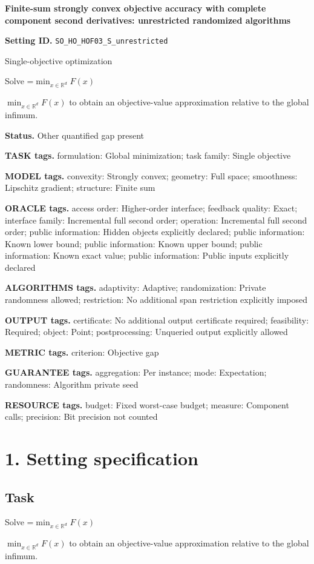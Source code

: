 \documentclass[10pt,a4paper]{article}
\newcommand{\AtlasMath}[1]{\par\begingroup\centering\setbox0=\hbox{$\displaystyle #1$}\ifdim\wd0>1.4\linewidth\typeout{ATLAS WIDE FORMULA: \the\wd0}\fi\ifdim\wd0>\linewidth\resizebox{\linewidth}{!}{\box0}\else\box0\fi\par\endgroup}
\newcommand{\AtlasInlineMath}[1]{\begingroup\setbox0=\hbox{$#1$}\ifdim\wd0>.4\linewidth\endgroup\AtlasMath{#1}\else\endgroup$#1$\fi}
\begin{document}
\raggedright

{\LARGE\bfseries\sffamily\color{AtlasNavy} Finite-sum strongly convex objective accuracy with complete component second derivatives: unrestricted randomized algorithms\par}\vspace{5pt}
\textbf{Setting ID.} \texttt{SO\_\allowbreak{}HO\_\allowbreak{}HOF03\_\allowbreak{}S\_\allowbreak{}unrestricted}

Single-objective optimization

Solve \AtlasInlineMath{\min_{x\in \mathbb{R}^d}F(x)} to obtain an objective-value approximation relative to the global infimum.

\textbf{Status.} Other quantified gap present

\textbf{TASK tags.} formulation: Global minimization; task family: Single objective

\textbf{MODEL tags.} convexity: Strongly convex; geometry: Full space; smoothness: Lipschitz gradient; structure: Finite sum

\textbf{ORACLE tags.} access order: Higher-order interface; feedback quality: Exact; interface family: Incremental full second order; operation: Incremental full second order; public information: Hidden objects explicitly declared; public information: Known lower bound; public information: Known upper bound; public information: Known exact value; public information: Public inputs explicitly declared

\textbf{ALGORITHMS tags.} adaptivity: Adaptive; randomization: Private randomness allowed; restriction: No additional span restriction explicitly imposed

\textbf{OUTPUT tags.} certificate: No additional output certificate required; feasibility: Required; object: Point; postprocessing: Unqueried output explicitly allowed

\textbf{METRIC tags.} criterion: Objective gap

\textbf{GUARANTEE tags.} aggregation: Per instance; mode: Expectation; randomness: Algorithm private seed

\textbf{RESOURCE tags.} budget: Fixed worst-case budget; measure: Component calls; precision: Bit precision not counted

\section{1. Setting specification}
\subsection{Task}
Solve \AtlasInlineMath{\min_{x\in \mathbb{R}^d}F(x)} to obtain an objective-value approximation relative to the global infimum.
\end{document}
